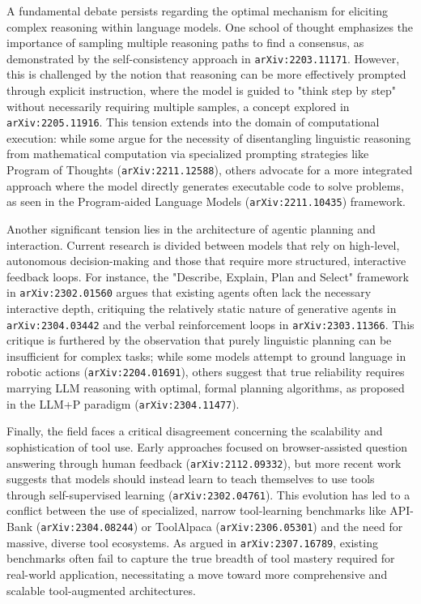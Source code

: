 \documentclass[11pt]{article}
\begin{document}
A fundamental debate persists regarding the optimal mechanism for eliciting complex reasoning within language models. One school of thought emphasizes the importance of sampling multiple reasoning paths to find a consensus, as demonstrated by the self-consistency approach in \texttt{arXiv:2203.11171}. However, this is challenged by the notion that reasoning can be more effectively prompted through explicit instruction, where the model is guided to "think step by step" without necessarily requiring multiple samples, a concept explored in \texttt{arXiv:2205.11916}. This tension extends into the domain of computational execution: while some argue for the necessity of disentangling linguistic reasoning from mathematical computation via specialized prompting strategies like Program of Thoughts (\texttt{arXiv:2211.12588}), others advocate for a more integrated approach where the model directly generates executable code to solve problems, as seen in the Program-aided Language Models (\texttt{arXiv:2211.10435}) framework.

Another significant tension lies in the architecture of agentic planning and interaction. Current research is divided between models that rely on high-level, autonomous decision-making and those that require more structured, interactive feedback loops. For instance, the "Describe, Explain, Plan and Select" framework in \texttt{arXiv:2302.01560} argues that existing agents often lack the necessary interactive depth, critiquing the relatively static nature of generative agents in \texttt{arXiv:2304.03442} and the verbal reinforcement loops in \texttt{arXiv:2303.11366}. This critique is furthered by the observation that purely linguistic planning can be insufficient for complex tasks; while some models attempt to ground language in robotic actions (\texttt{arXiv:2204.01691}), others suggest that true reliability requires marrying LLM reasoning with optimal, formal planning algorithms, as proposed in the LLM+P paradigm (\texttt{arXiv:2304.11477}).

Finally, the field faces a critical disagreement concerning the scalability and sophistication of tool use. Early approaches focused on browser-assisted question answering through human feedback (\texttt{arXiv:2112.09332}), but more recent work suggests that models should instead learn to teach themselves to use tools through self-supervised learning (\texttt{arXiv:2302.04761}). This evolution has led to a conflict between the use of specialized, narrow tool-learning benchmarks like API-Bank (\texttt{arXiv:2304.08244}) or ToolAlpaca (\texttt{arXiv:2306.05301}) and the need for massive, diverse tool ecosystems. As argued in \texttt{arXiv:2307.16789}, existing benchmarks often fail to capture the true breadth of tool mastery required for real-world application, necessitating a move toward more comprehensive and scalable tool-augmented architectures.
\end{document}
